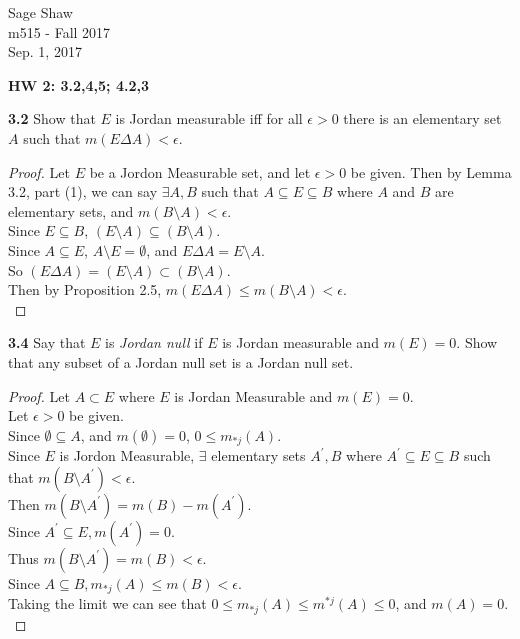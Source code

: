 \documentclass[12pt]{article}
\begin{document}
	\thispagestyle{empty}
	
\begin{flushright}
	Sage Shaw \\
	m515 - Fall 2017 \\
	Sep. 1, 2017
\end{flushright}
	
{\large \textbf{HW 2: 3.2,4,5; 4.2,3}}\bigbreak

\hspace{-4 ex}\textbf{3.2} Show that $E$ is Jordan measurable iff for all $\epsilon>0$ there is an elementary set $A$ such that $m(E\Delta A)<\epsilon$. \bigbreak

	\begin{proof}
		Let $E$ be a Jordon Measurable set, and let $\epsilon >0$ be given. Then by Lemma 3.2, part (1), we can say $\exists A,B$ such that $A \subseteq E \subseteq B$ where $A$ and $B$ are elementary sets, and $m(B\setminus A)< \epsilon$. \\
		Since $E \subseteq B$, $(E \setminus A) \subseteq (B \setminus A)$. \\
		Since $A \subseteq E$, $A \setminus E = \emptyset$, and $E \Delta A = E \setminus A$. \\ 
		So $(E \Delta A) = (E \setminus A) \subset (B \setminus A)$.\\
		Then by Proposition 2.5, $m(E \Delta A) \leq m(B \setminus A) < \epsilon$.\\
	\end{proof}

\hspace{-4 ex}\textbf{3.4} Say that $E$ is \emph{Jordan null} if $E$ is Jordan measurable and $m(E)=0$. Show that any subset of a Jordan null set is a Jordan null set. \bigbreak

	\begin{proof}
		Let $A \subset E$ where $E$ is Jordan Measurable and $m(E)=0$. \\
		Let $\epsilon >0$ be given.\\
		Since $\emptyset \subseteq A$, and $m(\emptyset)=0$,  $0 \leq m_{*j}(A)$.\\
		Since $E$ is Jordon Measurable, $\exists$ elementary sets $A^{\prime}, B$ where $A^{\prime} \subseteq E \subseteq B$ such that $m(B \setminus A^{\prime})<\epsilon$. \\
		Then $m(B \setminus A^{\prime}) = m(B) - m(A^{\prime})$. \\
		Since $A^{\prime} \subseteq E, m(A^{\prime}) = 0$. \\
		Thus $m(B \setminus A^{\prime}) = m(B) < \epsilon$. \\
		Since $A \subseteq B, m_{*j}(A) \leq m(B) < \epsilon$. \\
		Taking the limit we can see that $0 \leq m_{*j}(A) \leq m^{*j}(A) \leq 0$, and $m(A)=0$.\\		
	\end{proof}
\end{document}
